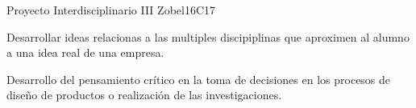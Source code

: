 \begin{syllabus}
\begin{unit}{Proyecto Interdisciplinario III }{}{Zobel}{16}{C17}
\begin{topics}
      \item Desarrollar ideas relacionas a las multiples discipiplinas  que aproximen al alumno a una idea real de una empresa.
\end{topics}

\begin{learningoutcomes}
   \item Desarrollo del pensamiento crítico en la toma de decisiones en los procesos de diseño de productos o realización de las investigaciones.
\end{learningoutcomes}
\end{unit}

\begin{coursebibliography}
\end{coursebibliography}

\end{syllabus}
